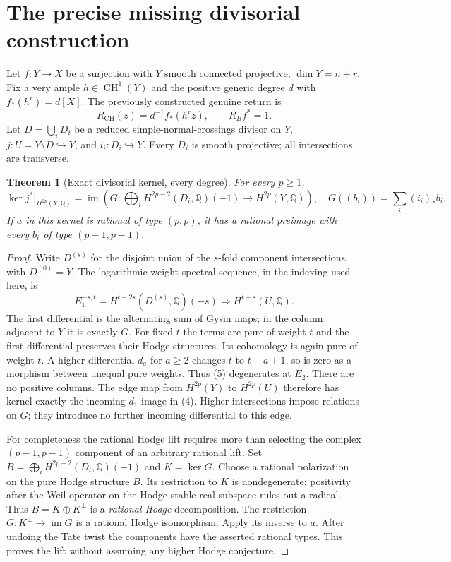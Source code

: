 \documentclass[11pt]{article}
\newtheorem{theorem}{Theorem}
\newcommand{\Q}{\mathbb Q}
\newcommand{\CH}{\operatorname{CH}}
\begin{document}
\section{The precise missing divisorial construction}
Let $f:Y\to X$ be a surjection with $Y$ smooth connected projective,
$\dim Y=n+r$. Fix a very ample $h\in\CH^1(Y)$ and the positive generic
degree $d$ with $f_*(h^r)=d[X]$. The previously constructed genuine return is
\[
 R_{\CH}(z)=d^{-1}f_*(h^r z),\qquad R_B f^*=1.             \tag{3}
\]
Let $D=\bigcup_i D_i$ be a reduced simple-normal-crossings divisor on $Y$,
$j:U=Y\setminus D\hookrightarrow Y$, and $i_i:D_i\hookrightarrow Y$.
Every $D_i$ is smooth projective; all intersections are transverse.

\begin{theorem}[Exact divisorial kernel, every degree]\label{thm:kernel}
For every $p\geq1$,
\[
 \ker j^*|_{H^{2p}(Y,\Q)}
 =\operatorname{im}\left(G:\bigoplus_i H^{2p-2}(D_i,\Q)(-1)
                \longrightarrow H^{2p}(Y,\Q)\right),\quad
 G((b_i))=\sum_i(i_i)_*b_i.                              \tag{4}
\]
If $a$ in this kernel is rational of type $(p,p)$, it has a rational
preimage with every $b_i$ of type $(p-1,p-1)$.
\end{theorem}
\begin{proof}
Write $D^{(s)}$ for the disjoint union of the $s$-fold component
intersections, with $D^{(0)}=Y$. The logarithmic weight spectral sequence,
in the indexing used here, is
\[
 E_1^{-s,t}=H^{t-2s}(D^{(s)},\Q)(-s)
       \Longrightarrow H^{t-s}(U,\Q).                    \tag{5}
\]
The first differential is the alternating sum of Gysin maps; in the
column adjacent to $Y$ it is exactly $G$. For fixed $t$ the terms are
pure of weight $t$ and the first differential preserves their Hodge
structures. Its cohomology is again pure of weight $t$.
A higher differential $d_a$ for $a\geq2$ changes $t$ to $t-a+1$,
so is zero as a morphism between unequal pure weights. Thus (5)
degenerates at $E_2$. There are no positive columns. The edge map from
$H^{2p}(Y)$ to $H^{2p}(U)$ therefore has kernel exactly the incoming
$d_1$ image in (4). Higher intersections impose relations on $G$;
they introduce no further incoming differential to this edge.

For completeness the rational Hodge lift requires more than selecting
the complex $(p-1,p-1)$ component of an arbitrary rational lift.
Set $B=\bigoplus_i H^{2p-2}(D_i,\Q)(-1)$ and $K=\ker G$.
Choose a rational polarization on the pure Hodge structure $B$.
Its restriction to $K$ is nondegenerate: positivity after the Weil
operator on the Hodge-stable real subspace rules out a radical.
Thus $B=K\oplus K^\perp$ is a \emph{rational Hodge} decomposition.
The restriction $G:K^\perp\to\operatorname{im}G$ is a rational Hodge
isomorphism. Apply its inverse to $a$. After undoing the Tate twist
the components have the asserted rational types. This proves the lift
without assuming any higher Hodge conjecture.
\end{proof}
\end{document}
